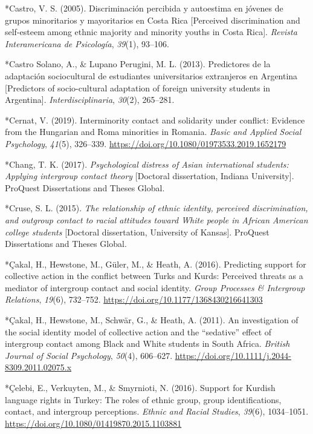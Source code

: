 \documentclass[12pt, letterpaper]{article}
\begin{document}
\leavevmode\hypertarget{ref-480}{}%
*Castro, V. S. (2005). Discriminación percibida y autoestima en jóvenes
de grupos minoritarios y mayoritarios en Costa Rica {[}Perceived
discrimination and self-esteem among ethnic majority and minority youths
in Costa Rica{]}. \emph{Revista Interamericana de Psicología},
\emph{39}(1), 93--106.

\leavevmode\hypertarget{ref-1914}{}%
*Castro Solano, A., \& Lupano Perugini, M. L. (2013). Predictores de la
adaptación sociocultural de estudiantes universitarios extranjeros en
Argentina {[}Predictors of socio-cultural adaptation of foreign
university students in Argentina{]}. \emph{Interdisciplinaria},
\emph{30}(2), 265--281.

\leavevmode\hypertarget{ref-3205}{}%
*Cernat, V. (2019). Interminority contact and solidarity under conflict:
Evidence from the Hungarian and Roma minorities in Romania. \emph{Basic
and Applied Social Psychology}, \emph{41}(5), 326--339.
\url{https://doi.org/10.1080/01973533.2019.1652179}

\leavevmode\hypertarget{ref-91}{}%
*Chang, T. K. (2017). \emph{Psychological distress of Asian
international students: Applying intergroup contact theory} {[}Doctoral
dissertation, Indiana University{]}. ProQuest Dissertations and Theses
Global.

\leavevmode\hypertarget{ref-1163}{}%
*Cruse, S. L. (2015). \emph{The relationship of ethnic identity,
perceived discrimination, and outgroup contact to racial attitudes
toward White people in African American college students} {[}Doctoral
dissertation, University of Kansas{]}. ProQuest Dissertations and Theses
Global.

\leavevmode\hypertarget{ref-1248}{}%
*Çakal, H., Hewstone, M., Güler, M., \& Heath, A. (2016). Predicting
support for collective action in the conflict between Turks and Kurds:
Perceived threats as a mediator of intergroup contact and social
identity. \emph{Group Processes \& Intergroup Relations}, \emph{19}(6),
732--752. \url{https://doi.org/10.1177/1368430216641303}

\leavevmode\hypertarget{ref-284}{}%
*Çakal, H., Hewstone, M., Schwär, G., \& Heath, A. (2011). An
investigation of the social identity model of collective action and the
``sedative'' effect of intergroup contact among Black and White students
in South Africa. \emph{British Journal of Social Psychology},
\emph{50}(4), 606--627.
\url{https://doi.org/10.1111/j.2044-8309.2011.02075.x}

\leavevmode\hypertarget{ref-1614}{}%
*Çelebi, E., Verkuyten, M., \& Smyrnioti, N. (2016). Support for Kurdish
language rights in Turkey: The roles of ethnic group, group
identifications, contact, and intergroup perceptions. \emph{Ethnic and
Racial Studies}, \emph{39}(6), 1034--1051.
\url{https://doi.org/10.1080/01419870.2015.1103881}
\end{document}
